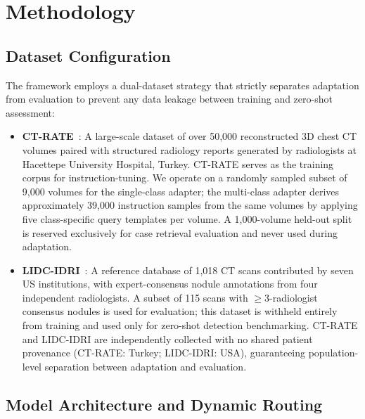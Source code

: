 \documentclass[lineno,referee,pdflatex,sn-mathphys-num]{sn-jnl}
\begin{document}
\FloatBarrier
\section{Methodology}
\label{sec:method}

\subsection{Dataset Configuration}

The framework employs a dual-dataset strategy that strictly separates
adaptation from evaluation to prevent any data leakage between training
and zero-shot assessment:

\begin{itemize}
  \item \textbf{CT-RATE}~\cite{ctrate2024}: A large-scale dataset of over
    50{,}000 reconstructed 3D chest CT volumes paired with structured
    radiology reports generated by radiologists at Hacettepe University
    Hospital, Turkey. CT-RATE serves as the training corpus for
    instruction-tuning. We operate on a randomly sampled subset of
    9{,}000 volumes for the single-class adapter; the multi-class adapter
    derives approximately 39{,}000 instruction samples from the same
    volumes by applying five class-specific query templates per volume.
    A 1{,}000-volume held-out split is reserved exclusively for case
    retrieval evaluation and never used during adaptation.

  \item \textbf{LIDC-IDRI}~\cite{lidc2011}: A reference database of
    1{,}018 CT scans contributed by seven US institutions, with
    expert-consensus nodule annotations from four independent
    radiologists. A subset of 115 scans with $\geq$3-radiologist consensus
    nodules is used for evaluation; this dataset is withheld entirely from
    training and used only for zero-shot detection benchmarking. CT-RATE
    and LIDC-IDRI are independently collected with no shared patient
    provenance (CT-RATE: Turkey; LIDC-IDRI: USA), guaranteeing
    population-level separation between adaptation and evaluation.
\end{itemize}

\subsection{Model Architecture and Dynamic Routing}
\end{document}
